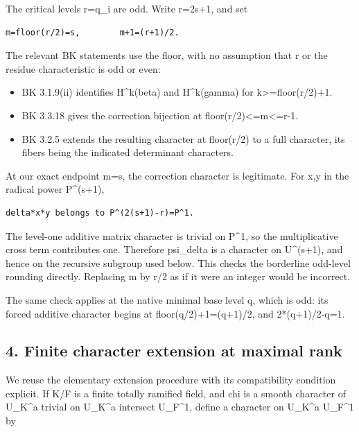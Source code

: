 The critical levels r=q\_i are odd. Write r=2s+1, and set

\begin{Verbatim}[fontsize=\small,breaklines=true,breakanywhere=true]
m=floor(r/2)=s,        m+1=(r+1)/2.
\end{Verbatim}

The relevant BK statements use the floor, with no assumption that r or
the residue characteristic is odd or even:

\begin{itemize}
\tightlist
\item
  BK 3.1.9(ii) identifies H\^{}k(beta) and H\^{}k(gamma) for
  k\textgreater=floor(r/2)+1.
\item
  BK 3.3.18 gives the correction bijection at
  floor(r/2)\textless=m\textless=r-1.
\item
  BK 3.2.5 extends the resulting character at floor(r/2) to a full
  character, its fibers being the indicated determinant characters.
\end{itemize}

At our exact endpoint m=s, the correction character is legitimate. For
x,y in the radical power P\^{}(s+1),

\begin{Verbatim}[fontsize=\small,breaklines=true,breakanywhere=true]
delta*x*y belongs to P^(2(s+1)-r)=P^1.
\end{Verbatim}

The level-one additive matrix character is trivial on P\^{}1, so the
multiplicative cross term contributes one. Therefore psi\_delta is a
character on U\^{}(s+1), and hence on the recursive subgroup used below.
This checks the borderline odd-level rounding directly. Replacing m by
r/2 as if it were an integer would be incorrect.

The same check applies at the native minimal base level q, which is odd:
its forced additive character begins at floor(q/2)+1=(q+1)/2, and
2*(q+1)/2-q=1.

\hypertarget{dyadic_character-finite-character-extension-at-maximal-rank}{%
\subsection{4. Finite character extension at maximal
rank}\label{dyadic_character-finite-character-extension-at-maximal-rank}}

We reuse the elementary extension procedure with its compatibility
condition explicit. If K/F is a finite totally ramified field, and chi
is a smooth character of U\_K\^{}a trivial on U\_K\^{}a intersect
U\_F\^{}1, define a character on U\_K\^{}a U\_F\^{}1 by

